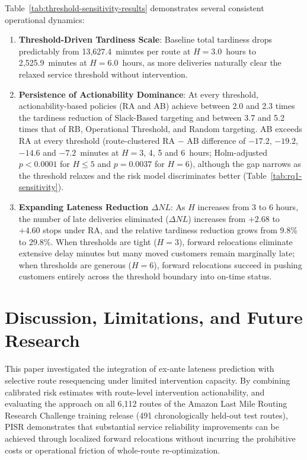 \documentclass[11pt,a4paper]{article}
\begin{document}
Table~\ref{tab:threshold-sensitivity-results} demonstrates several consistent operational dynamics:
\begin{enumerate}
    \item \textbf{Threshold-Driven Tardiness Scale}: Baseline total tardiness drops predictably from 13,627.4~minutes per route at $H = 3.0$~hours to 2,525.9~minutes at $H = 6.0$~hours, as more deliveries naturally clear the relaxed service threshold without intervention.
    \item \textbf{Persistence of Actionability Dominance}: At every threshold, actionability-based policies (RA and AB) achieve between 2.0 and 2.3 times the tardiness reduction of Slack-Based targeting and between 3.7 and 5.2 times that of RB, Operational Threshold, and Random targeting. AB exceeds RA at every threshold (route-clustered RA $-$ AB difference of $-17.2$, $-19.2$, $-14.6$ and $-7.2$~minutes at $H = 3$, 4, 5 and 6~hours; Holm-adjusted $p < 0.0001$ for $H \le 5$ and $p = 0.0037$ for $H = 6$), although the gap narrows as the threshold relaxes and the risk model discriminates better (Table~\ref{tab:rq1-sensitivity}).
    \item \textbf{Expanding Lateness Reduction $\Delta NL$}: As $H$ increases from 3 to 6 hours, the number of late deliveries eliminated ($\Delta NL$) increases from $+2.68$ to $+4.60$ stops under RA, and the relative tardiness reduction grows from 9.8\% to 29.8\%. When thresholds are tight ($H=3$), forward relocations eliminate extensive delay minutes but many moved customers remain marginally late; when thresholds are generous ($H=6$), forward relocations succeed in pushing customers entirely across the threshold boundary into on-time status.
\end{enumerate}

\section{Discussion, Limitations, and Future Research}\label{sec:conclusion}

This paper investigated the integration of ex-ante lateness prediction with selective route resequencing under limited intervention capacity. By combining calibrated risk estimates with route-level intervention actionability, and evaluating the approach on all 6,112 routes of the Amazon Last Mile Routing Research Challenge training release (491 chronologically held-out test routes), PISR demonstrates that substantial service reliability improvements can be achieved through localized forward relocations without incurring the prohibitive costs or operational friction of whole-route re-optimization.
\end{document}
